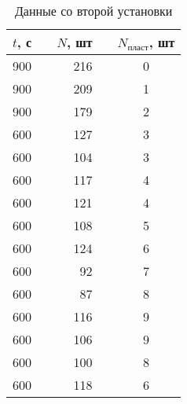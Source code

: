 \begin{table}
\centering
\caption{Данные со второй установки}
\label{tab:data2}
\begin{tabular}{rcrcc}
\toprule
 $t$, с & \hspace*{10pt} &  $N$, шт & \hspace*{10pt} &  $N_{\text{пласт}}$, шт \\
\midrule
  900 && 216 && 0 \\
  900 && 209 && 1 \\
  900 && 179 && 2 \\
  600 && 127 && 3 \\
  600 && 104 && 3 \\
  600 && 117 && 4 \\
  600 && 121 && 4 \\
  600 && 108 && 5 \\
  600 && 124 && 6 \\
  600 && 92  && 7 \\
  600 && 87  && 8 \\
  600 && 116 && 9 \\
  600 && 106 && 9 \\
  600 && 100 && 8 \\
  600 && 118 && 6 \\
\bottomrule
\end{tabular}
\end{table}
